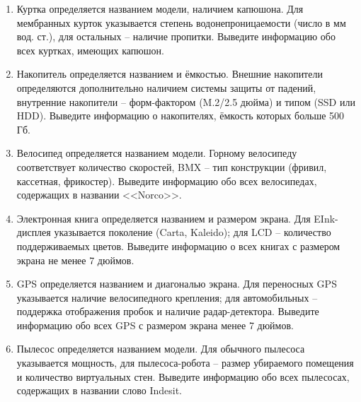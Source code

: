 \begin{enumerate}
\item Куртка определяется названием модели, наличием капюшона. 
Для мембранных курток указывается степень водонепроницаемости 
(число в мм вод. ст.), для остальных -- наличие пропитки.
Выведите информацию обо всех куртках, имеющих капюшон.

\item Накопитель определяется названием и ёмкостью. Внешние накопители определяются дополнительно
наличием системы защиты от падений, внутренние накопители -- форм-фактором (M.2/2.5 дюйма) и типом
(SSD или HDD).
Выведите информацию о накопителях, ёмкость которых больше 500 Гб.

\item Велосипед определяется названием модели. Горному велосипеду соответствует количество скоростей, BMX -- тип
конструкции (фривил, кассетная, фрикостер). Выведите информацию обо всех велосипедах,
содержащих в названии <<Norco>>.

\item Электронная книга определяется названием и размером экрана. Для EInk-дисплея указывается поколение
(Carta, Kaleido); для LCD -- количество поддерживаемых цветов. Выведите информацию о всех книгах с размером экрана
не менее 7 дюймов.

\item GPS определяется названием и диагональю экрана. Для переносных GPS указывается наличие велосипедного
крепления; для автомобильных -- поддержка отображения пробок и наличие радар-детектора.
Выведите информацию обо всех GPS с размером экрана менее 7 дюймов.

\item Пылесос определяется названием модели. Для обычного пылесоса указывается мощность, для пылесоса-робота --
размер убираемого помещения и количество виртуальных стен. Выведите информацию обо всех пылесосах,
содержащих в названии слово Indesit.



\end{enumerate}
